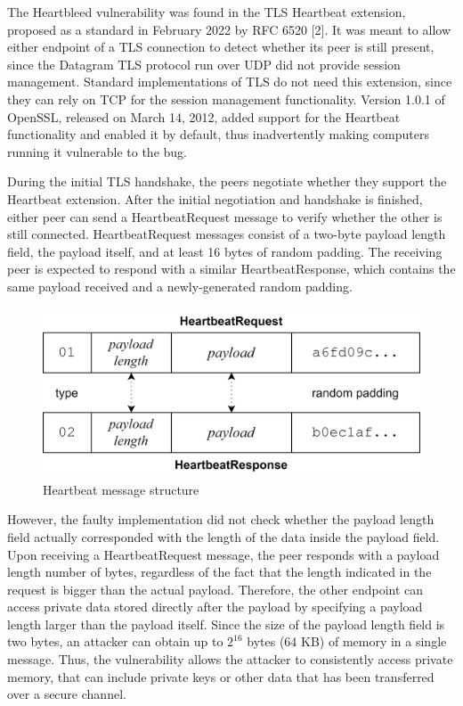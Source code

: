 \documentclass[12pt,a4paper,english,onecolumn]{IEEEtran}
\begin{document}
The Heartbleed vulnerability was found in the TLS Heartbeat extension, proposed as a standard in February 2022 by RFC 6520 [2]. It was meant to allow either endpoint of a TLS connection to detect whether its peer is still present, since the Datagram TLS protocol run over UDP did not provide session management. Standard implementations of TLS do not need this extension, since they can rely on TCP for the session management functionality. Version 1.0.1 of OpenSSL, released on March 14, 2012, added support for the Heartbeat functionality and enabled it by default, thus inadvertently making computers running it vulnerable to the bug. \par
During the initial TLS handshake, the peers negotiate whether they support the Heartbeat extension. After the initial negotiation and handshake is finished, either peer can send a HeartbeatRequest message to verify whether the other is still connected. HeartbeatRequest messages consist of a two-byte payload length field, the payload itself, and at least 16 bytes of random padding. The receiving peer is expected to respond with a similar HeartbeatResponse, which contains the same payload received and a newly-generated random padding. \par
\vspace{5px}
\begin{figure}
  \begin{center}
    \includegraphics[scale=0.1]{images/heartbeat-packet.png}
  \end{center}
  \caption{Heartbeat message structure}
\end{figure}
However, the faulty implementation did not check whether the payload length field actually corresponded with the length of the data inside the payload field. Upon receiving a HeartbeatRequest message, the peer responds with a payload length number of bytes, regardless of the fact that the length indicated in the request is bigger than the actual payload. Therefore, the other endpoint can access private data stored directly after the payload by specifying a payload length larger than the payload itself. Since the size of the payload length field is two bytes, an attacker can obtain up to $2^{16}$ bytes (64 KB) of memory in a single message. Thus, the vulnerability allows the attacker to consistently access private memory, that can include private keys or other data that has been transferred over a secure channel. \par
\end{document}
